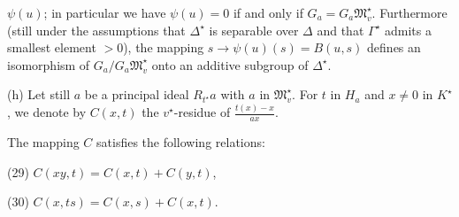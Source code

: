 $\psi(u)$; in particular we have $\psi(u) = 0$ if and only if $G_a = G_a \mathfrak{M}_v^\star$. Furthermore (still under the assumptions that $\Delta^\star$ is separable over $\Delta$ and that $\Gamma^\star$ admits a smallest element $> 0$), the mapping $s \rightarrow \psi(u)(s) = B(u, s)$ defines an isomorphism of $G_a / G_a \mathfrak{M}_v^\star$ onto an additive subgroup of $\Delta^\star$.

(h) Let still $a$ be a principal ideal $R_{t^\star}a$ with $a$ in $\mathfrak{M}_v^\star$. For $t$ in $H_a$ and $x \neq 0$ in $K^\star$, we denote by $C(x, t)$ the $v^\star$-residue of $\frac{t(x) - x}{ax}$.

The mapping $C$ satisfies the following relations:

(29) $C(xy, t) = C(x, t) + C(y, t)$,

(30) $C(x, ts) = C(x, s) + C(x, t)$.